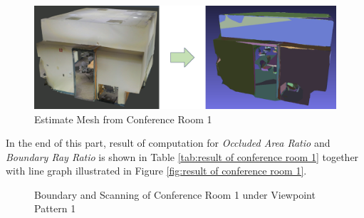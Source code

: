 \documentclass[11pt, a4paper,oneside,chapterprefix=false]{scrbook}
\begin{document}
\vspace{30pt}

\begin{figure}[H]
    \centering
    \includegraphics*[width=1.0\textwidth]{figures/estimate conf1.png}
    \caption{Estimate Mesh from Conference Room 1}
    \label{fig:estimate mesh from conference room 1}
\end{figure}

\vspace{30pt}

In the end of this part, result of computation for \emph{Occluded Area Ratio} and \emph{Boundary Ray Ratio} is shown in Table \ref{tab:result of conference room 1} together with line graph illustrated in Figure \ref{fig:result of conference room 1}.


\begin{figure}[H]
    \centering
      \label{fig:conf1 b 0} \hfill
     \label{fig:conf1 s 0}
    \caption{Boundary and Scanning of Conference Room 1 under Viewpoint Pattern 1}
    \label{fig:conf1 0}
\end{figure}
\end{document}
